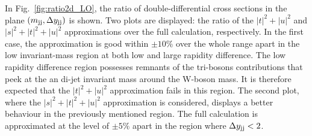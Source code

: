 In Fig.~\ref{fig:ratio2d_LO}, the ratio of double-differential cross sections in the plane $\left(m_{\text{j}\text{j}}, \Delta y_{\text{j}\text{j}}\right)$ is shown.
Two plots are displayed: the ratio of the $|t|^2 + |u|^2$ and $|s|^2 + |t|^2 + |u|^2$ approximations over the full calculation, respectively.
In the first case, the approximation is good within $\pm10\%$ over the whole range apart in the low invariant-mass region at both low and large rapidity difference.
The low rapidity difference region possesses remnants of the tri-bosons contributions that peek at the an di-jet invariant mass around the W-boson mass.
It is therefore expected that the $|t|^2 + |u|^2$ approximation fails in this region.
The second plot, where the $|s|^2 + |t|^2 + |u|^2$ approximation is considered, displays a better behaviour in the previously mentioned region.
The full calculation is approximated at the level of $\pm5\%$ apart in the region where $\Delta y_{\text{j}\text{j}} < 2$.

